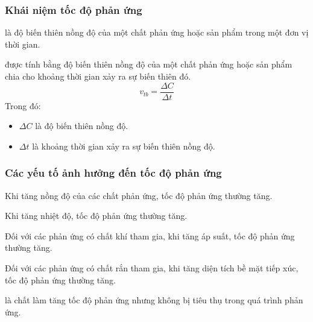 \documentclass[Main.tex]{subfiles}
\begin{document}
\subsubsection{Khái niệm tốc độ phản ứng}
    \begin{ghinho}
         là độ biến thiên nồng độ của một chất phản ứng hoặc sản phẩm trong một đơn vị thời gian.
    \end{ghinho}
    \begin{ghinho}
         được tính bằng độ biến thiên nồng độ của một chất phản ứng hoặc sản phẩm chia cho khoảng thời gian xảy ra sự biến thiên đó.
        \[
            v_{tb} = \frac{\Delta C}{\Delta t}
        \]
        Trong đó:
        \begin{itemize}
            \item $\Delta C$ là độ biến thiên nồng độ.
            \item $\Delta t$ là khoảng thời gian xảy ra sự biến thiên nồng độ.
        \end{itemize}
    \end{ghinho}
\subsubsection{Các yếu tố ảnh hưởng đến tốc độ phản ứng}
    \begin{ghinho}
        Khi tăng nồng độ của các chất phản ứng, tốc độ phản ứng thường tăng.
    \end{ghinho}
    \begin{ghinho}
        Khi tăng nhiệt độ, tốc độ phản ứng thường tăng.
    \end{ghinho}
    \begin{ghinho}
        Đối với các phản ứng có chất khí tham gia, khi tăng áp suất, tốc độ phản ứng thường tăng.
    \end{ghinho}
    \begin{ghinho}
        Đối với các phản ứng có chất rắn tham gia, khi tăng diện tích bề mặt tiếp xúc, tốc độ phản ứng thường tăng.
    \end{ghinho}
    \begin{ghinho}
         là chất làm tăng tốc độ phản ứng nhưng không bị tiêu thụ trong quá trình phản ứng.
    \end{ghinho}
\end{document}

